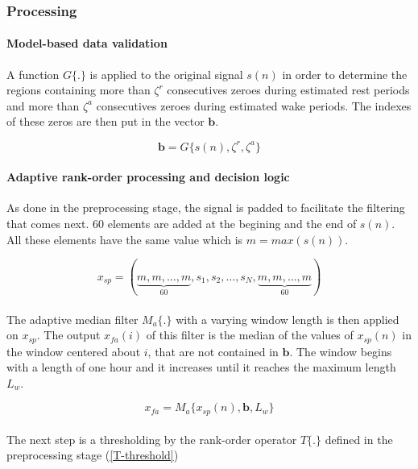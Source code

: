 \documentclass[a4paper,12pt]{article}
\begin{document}
\subsubsection{Processing}

\paragraph{Model-based data validation}
A function $G\{.\}$ is applied to the original signal $s(n)$ in order to determine the regions containing more than $\zeta^r$ consecutives zeroes during estimated rest periods and more than $\zeta^a$ consecutives zeroes during estimated wake periods. The indexes of these zeros are then put in the vector $\mathbf{b}$.

\begin{equation}
\mathbf{b} = G\{s(n), \zeta^r, \zeta^a\}
\end{equation}

\paragraph{Adaptive rank-order processing and decision logic}
As done in the preprocessing stage, the signal is padded to facilitate the filtering that comes next. 60 elements are added at the begining and the end of $s(n)$. All these elements have the same value which is $m = max(s(n))$.

\begin{equation}
x_{sp} = (\underbrace{m, m, \ldots, m}_{60}, s_1, s_2, \ldots, s_N, \underbrace{m, m, \ldots, m}_{60})
\end{equation}

\paragraph{}
The adaptive median filter $M_a\{.\}$ with a varying window length is then applied on $x_{sp}$. The output $x_{fa}(i)$ of this filter is the median of the values of $x_{sp}(n)$ in the window centered about $i$, that are not contained in $\mathbf{b}$.
The window begins with a length of one hour and it increases until it reaches the maximum length $L_w$.

\begin{equation}
x_{fa} = M_a\{x_{sp}(n), \mathbf{b}, L_w\}
\end{equation}

\paragraph{}
The next step is a thresholding by the rank-order operator $T\{.\}$ defined in the preprocessing stage (\ref{T-threshold})
\end{document}
